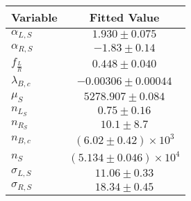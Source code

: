 \begin{tabular}[t]{lc}
\hline
Variable &Fitted Value\\
\hline\hline
$\alpha_{L, S}$&$1.930\pm0.075$\\
\hline
$\alpha_{R, S}$&$-1.83\pm0.14$\\
\hline
$f_{\frac{L}{R}}$&$0.448\pm0.040$\\
\hline
$\lambda_{B,c}$&$-0.00306\pm0.00044$\\
\hline
$\mu_S$&$5278.907\pm0.084$\\
\hline
$n_{L_S}$&$0.75\pm0.16$\\
\hline
$n_{R_S}$&$10.1\pm8.7$\\
\hline
$n_{B,c}$&$(6.02\pm0.42)\times 10^3$\\
\hline
$n_S$&$(5.134\pm0.046)\times 10^4$\\
\hline
$\sigma_{L, S}$&$11.06\pm0.33$\\
\hline
$\sigma_{R, S}$&$18.34\pm0.45$\\
\hline
\end{tabular}